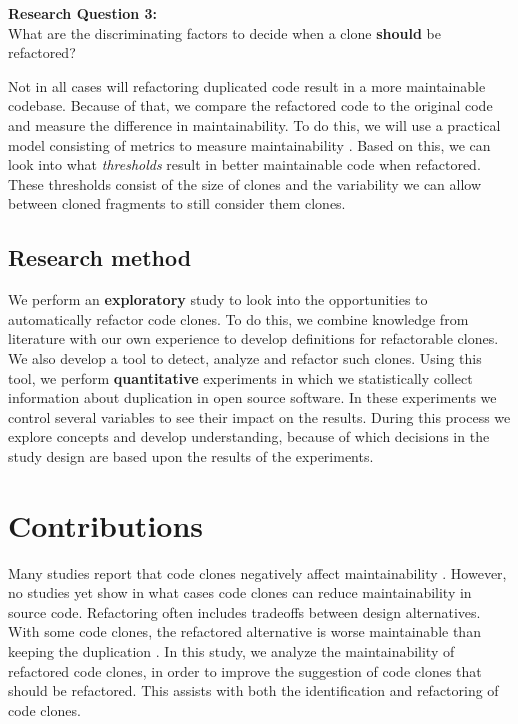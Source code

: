 \begin{displayquote}
\textbf{Research Question 3:}\\What are the discriminating factors to decide when a clone \textbf{should} be refactored?
\end{displayquote}
Not in all cases will refactoring duplicated code result in a more maintainable codebase. Because of that, we compare the refactored code to the original code and measure the difference in maintainability. To do this, we will use a practical model consisting of metrics to measure maintainability \cite{heitlager2007practical}. Based on this, we can look into what \textit{thresholds} result in better maintainable code when refactored. These thresholds consist of the size of clones and the variability we can allow between cloned fragments to still consider them clones.

\subsection{Research method}
We perform an \textbf{exploratory} study to look into the opportunities to automatically refactor code clones. To do this, we combine knowledge from literature with our own experience to develop definitions for refactorable clones. We also develop a tool to detect, analyze and refactor such clones. Using this tool, we perform \textbf{quantitative} experiments in which we statistically collect information about duplication in open source software. In these experiments we control several variables to see their impact on the results. During this process we explore concepts and develop understanding, because of which decisions in the study design are based upon the results of the experiments.

\section{Contributions}
Many studies report that code clones negatively affect maintainability \cite{heitlager2007practical, monden2002software, juergens2009code, chatterji2013effects}. However, no studies yet show in what cases code clones can reduce maintainability in source code. Refactoring often includes tradeoffs between design alternatives. With some code clones, the refactored alternative is worse maintainable than keeping the duplication \cite{kapser2006cloning, aversano2007clones, hotta2010duplicate, kim2005empirical, krinke2007study, saha2010evaluating}. In this study, we analyze the maintainability of refactored code clones, in order to improve the suggestion of code clones that should be refactored. This assists with both the identification and refactoring of code clones.


